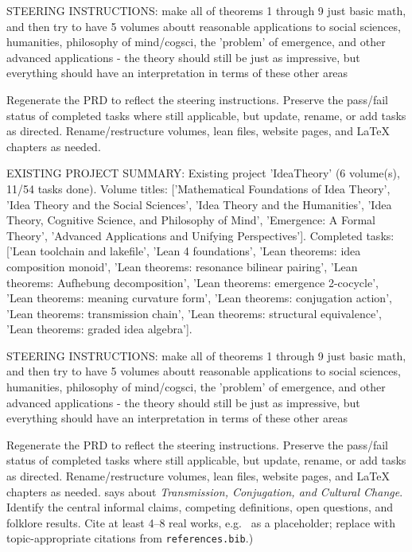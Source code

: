 STEERING INSTRUCTIONS: make all of theorems 1 through 9 just basic math, and then try to have 5 volumes aboutt reasonable applications to social sciences, humanities, philosophy of mind/cogsci, the 'problem' of emergence, and other advanced applications - the theory should still be just as impressive, but everything should have an interpretation in terms of these other areas

Regenerate the PRD to reflect the steering instructions. Preserve the pass/fail status of completed tasks where still applicable, but update, rename, or add tasks as directed. Rename/restructure volumes, lean files, website pages, and LaTeX chapters as needed.

EXISTING PROJECT SUMMARY: Existing project 'IdeaTheory' (6 volume(s), 11/54 tasks done). Volume titles: ['Mathematical Foundations of Idea Theory', 'Idea Theory and the Social Sciences', 'Idea Theory and the Humanities', 'Idea Theory, Cognitive Science, and Philosophy of Mind', 'Emergence: A Formal Theory', 'Advanced Applications and Unifying Perspectives']. Completed tasks: ['Lean toolchain and lakefile', 'Lean 4 foundations', 'Lean theorems: idea composition monoid', 'Lean theorems: resonance bilinear pairing', 'Lean theorems: Aufhebung decomposition', 'Lean theorems: emergence 2-cocycle', 'Lean theorems: meaning curvature form', 'Lean theorems: conjugation action', 'Lean theorems: transmission chain', 'Lean theorems: structural equivalence', 'Lean theorems: graded idea algebra'].

STEERING INSTRUCTIONS: make all of theorems 1 through 9 just basic math, and then try to have 5 volumes aboutt reasonable applications to social sciences, humanities, philosophy of mind/cogsci, the 'problem' of emergence, and other advanced applications - the theory should still be just as impressive, but everything should have an interpretation in terms of these other areas

Regenerate the PRD to reflect the steering instructions. Preserve the pass/fail status of completed tasks where still applicable, but update, rename, or add tasks as directed. Rename/restructure volumes, lean files, website pages, and LaTeX chapters as needed. says about \emph{Transmission, Conjugation, and Cultural Change}.  Identify the
        central informal claims, competing definitions, open questions, and
        folklore results.  Cite at least 4--8 real works, e.g.\ \cite{
        lean4_tpil} as a placeholder; replace with topic-appropriate
        citations from \texttt{references.bib}.)

